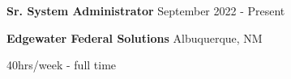 \documentclass[../main.tex]{subfiles}
\begin{document}
    \textbf{Sr. System Administrator}
    \hfill
    September 2022 - Present
    
    \textbf{Edgewater Federal Solutions}
    \hfill
    Albuquerque, NM
    
    \hfill
    40hrs/week - full time
    \begin{itemize}
    \end{itemize}
\end{document}
